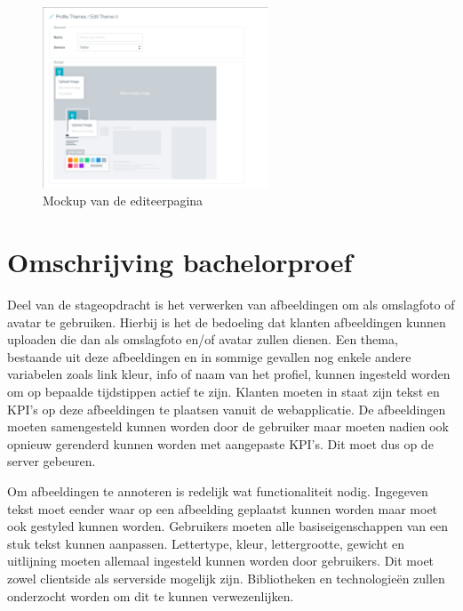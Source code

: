 \begin{figure}[H]
	\centering
	\includegraphics[width=0.6\textwidth]{Figuren/EditThemeMockup.png}
	\caption{Mockup van de editeerpagina \cite{EditThemeMockup}} %
	\label{fig:EditTheme}
\end{figure} 

\chapter{Omschrijving bachelorproef}
\vspace{-3cm}
Deel van de stageopdracht is het verwerken van afbeeldingen om als omslagfoto of avatar te gebruiken. Hierbij is het de bedoeling dat klanten afbeeldingen kunnen uploaden die dan als omslagfoto en/of avatar zullen dienen.  Een thema, bestaande uit deze afbeeldingen en in sommige gevallen nog enkele andere variabelen zoals link kleur, info of naam van het profiel, kunnen ingesteld worden om op bepaalde tijdstippen actief te zijn. Klanten moeten in staat zijn tekst en KPI's op deze afbeeldingen te plaatsen vanuit de webapplicatie. De afbeeldingen moeten samengesteld kunnen worden door de gebruiker maar moeten nadien ook opnieuw gerenderd kunnen worden met aangepaste KPI's. Dit moet dus op de server gebeuren. 

Om afbeeldingen te annoteren is redelijk wat functionaliteit nodig. Ingegeven tekst moet eender waar op een afbeelding geplaatst kunnen worden maar moet ook gestyled kunnen worden. Gebruikers moeten alle basiseigenschappen van een stuk tekst kunnen aanpassen. Lettertype, kleur, lettergrootte, gewicht en uitlijning moeten allemaal ingesteld kunnen worden door gebruikers. Dit moet zowel clientside als serverside mogelijk zijn. Bibliotheken en technologie\"{e}n zullen onderzocht worden om dit te kunnen verwezenlijken.


  


